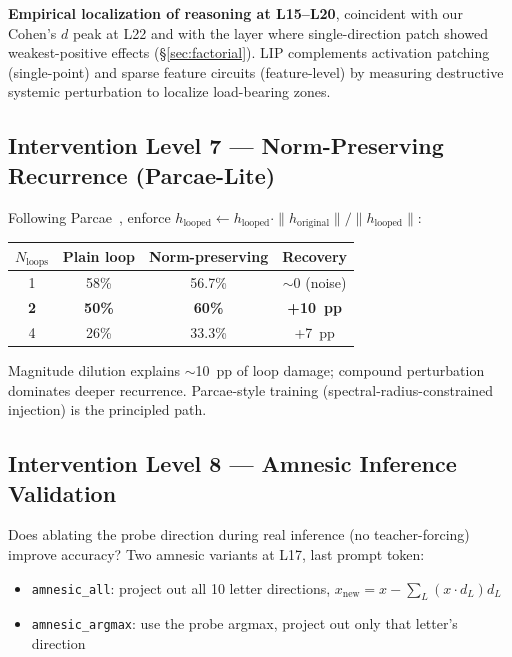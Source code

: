 \documentclass[11pt]{article}
\begin{document}
\textbf{Empirical localization of reasoning at L15--L20}, coincident with our Cohen's $d$ peak at L22 and with the layer where single-direction patch showed weakest-positive effects (\S\ref{sec:factorial}). LIP complements activation patching (single-point) and sparse feature circuits (feature-level) by measuring destructive systemic perturbation to localize load-bearing zones.

\subsection{Intervention Level 7 --- Norm-Preserving Recurrence (Parcae-Lite)}

Following Parcae~\cite{prairie2026parcae}, enforce $h_\text{looped} \leftarrow h_\text{looped} \cdot \|h_\text{original}\| / \|h_\text{looped}\|$:

\begin{center}
\begin{tabular}{cccc}
\toprule
$N_\text{loops}$ & Plain loop & Norm-preserving & Recovery \\
\midrule
1 & 58\% & 56.7\% & $\sim$0 (noise) \\
\textbf{2} & \textbf{50\%} & \textbf{60\%} & \textbf{+10~pp} \\
4 & 26\% & 33.3\% & +7~pp \\
\bottomrule
\end{tabular}
\end{center}

Magnitude dilution explains $\sim$10~pp of loop damage; compound perturbation dominates deeper recurrence. Parcae-style training (spectral-radius-constrained injection) is the principled path.

\subsection{Intervention Level 8 --- Amnesic Inference Validation}\label{sec:amnesic}

Does ablating the probe direction during real inference (no teacher-forcing) improve accuracy? Two amnesic variants at L17, last prompt token:
\begin{itemize}[leftmargin=*, topsep=0pt]
  \item \texttt{amnesic\_all}: project out all 10 letter directions, $x_\text{new} = x - \sum_L (x \cdot d_L) d_L$
  \item \texttt{amnesic\_argmax}: use the probe argmax, project out only that letter's direction
\end{itemize}
\end{document}
